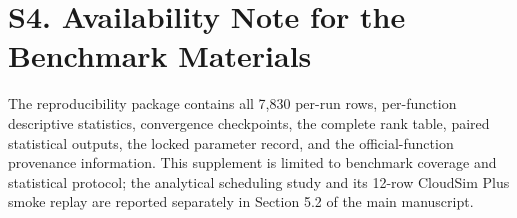 \documentclass[11pt]{article}
\begin{document}
\section*{S4. Availability Note for the Benchmark Materials}
The reproducibility package contains all 7,830 per-run rows, per-function descriptive statistics, convergence checkpoints, the complete rank table, paired statistical outputs, the locked parameter record, and the official-function provenance information. This supplement is limited to benchmark coverage and statistical protocol; the analytical scheduling study and its 12-row CloudSim Plus smoke replay are reported separately in Section 5.2 of the main manuscript.
\end{document}

